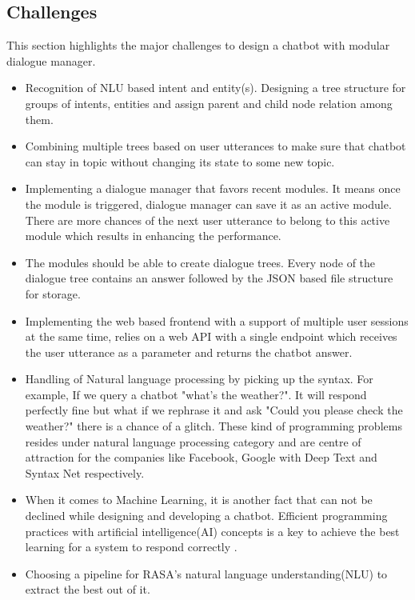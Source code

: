 \subsection{Challenges}
This section highlights the major challenges to design a chatbot with modular dialogue manager. 
\begin{itemize}
  \item Recognition of NLU based intent and entity(s). Designing a tree structure for groups of intents, entities and assign parent and child node relation among them.
   \item Combining multiple trees based on user utterances to make sure that chatbot can stay in topic without changing its state to some new topic.
   \item Implementing a dialogue manager that favors recent modules. It means once the module is triggered, dialogue manager can save it as an active module. There are more chances of the next user utterance to belong to this active module which results in enhancing the performance.
   \item The modules should be able to create dialogue trees. Every node of
   the dialogue tree contains an answer followed by the JSON based file structure for storage.
   \item Implementing the web based frontend with a support of multiple user sessions at the same time, relies on a web API with a single endpoint which receives the user utterance as a parameter and returns the chatbot answer.
   \item Handling of Natural language processing by picking up the syntax. For example, If we query a chatbot "what's the weather?". It will respond perfectly fine but what if we rephrase it and ask "Could you please check the weather?" there is a chance of a glitch. These kind of programming problems resides under natural language processing category and are centre of attraction for the companies like Facebook, Google with Deep Text and Syntax Net respectively. \cite{ProgrammingchallengesofChatbot}
   \item When it comes to Machine Learning, it is another fact that can not be declined while designing and developing a chatbot. Efficient programming practices with artificial intelligence(AI) concepts is a key to achieve the best learning for a system to respond correctly \cite{ProgrammingchallengesofChatbot}.
   \item Choosing a pipeline for RASA's natural language understanding(NLU) to extract the best out of it.
\end{itemize}


